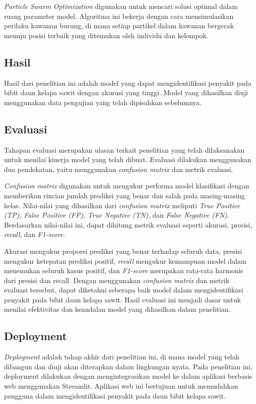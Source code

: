 \textit{Particle Swarm Optimization} digunakan untuk mencari solusi optimal dalam ruang parameter model. Algoritma ini bekerja dengan cara mensimulasikan perilaku kawanan burung, di mana setiap partikel dalam kawanan bergerak menuju posisi terbaik yang ditemukan oleh individu dan kelompok.

\subsection{Hasil} \label{III.Hasil}
Hasil dari penelitian ini adalah model yang dapat mengidentifikasi penyakit pada bibit daun kelapa sawit dengan akurasi yang tinggi. Model yang dihasilkan diuji menggunakan data pengujian yang telah dipisahkan sebelumnya. 

\subsection{Evaluasi} \label{III.Evaluasi}
Tahapan evaluasi merupakan ulasan terkait penelitian yang telah dilaksanakan untuk menilai kinerja model yang telah dibuat. Evaluasi dilakukan menggunakan dua pendekatan, yaitu menggunakan \textit{confusion matrix} dan metrik evaluasi.

\textit{Confusion matrix} digunakan untuk mengukur performa model klasifikasi dengan memberikan rincian jumlah prediksi yang benar dan salah pada masing-masing kelas. Nilai-nilai yang dihasilkan dari \textit{confusion matrix} meliputi \textit{True Positive (TP), False Positive (FP), True Negative (TN)}, dan \textit{False Negative (FN)}. Berdasarkan nilai-nilai ini, dapat dihitung metrik evaluasi seperti akurasi, presisi, \textit{recall}, dan \textit{F1-score}.

Akurasi mengukur proporsi prediksi yang benar terhadap seluruh data, presisi mengukur ketepatan prediksi positif, \textit{recall} mengukur kemampuan model dalam menemukan seluruh kasus positif, dan \textit{F1-score} merupakan rata-rata harmonis dari presisi dan recall. Dengan menggunakan \textit{confusion matrix} dan metrik evaluasi tersebut, dapat diketahui seberapa baik model dalam mengidentifikasi penyakit pada bibit daun kelapa sawit. Hasil evaluasi ini menjadi dasar untuk menilai efektivitas dan keandalan model yang dihasilkan dalam penelitian.

\subsection{Deployment} \label{III.Deployment}
\textit{Deployment} adalah tahap akhir dari penelitian ini, di mana model yang telah dibangun dan diuji akan diterapkan dalam lingkungan nyata. Pada penelitian ini, deployment dilakukan dengan mengintegrasikan model ke dalam aplikasi berbasis web menggunakan Streamlit. Aplikasi web ini bertujuan untuk memudahkan pengguna dalam mengidentifikasi penyakit pada daun bibit kelapa sawit. 

